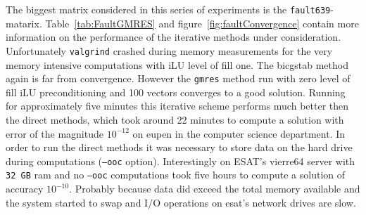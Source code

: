 The biggest matrix considered in this series of experiments is the \texttt{fault639}-matarix. Table~\ref{tab:FaultGMRES} and figure~\ref{fig:faultConvergence} contain more information on the performance of the iterative methods under consideration. Unfortunately \texttt{valgrind} crashed during memory measurements for the very memory intensive computations with iLU level of fill one. The bicgstab method again is far from convergence. However the \texttt{gmres} method run with zero level of fill iLU preconditioning and 100 vectors converges to a good solution. Running for approximately five minutes this iterative scheme performs much better then the direct methods, which took around 22 minutes to compute a solution with error of the magnitude $10^{-12}$ on eupen in the computer science department. In order to run the direct methods it was necessary to store data on the hard drive during computations (\texttt{--ooc} option). Interestingly on ESAT's vierre64 server with \texttt{32 GB} ram and no \texttt{--ooc} computations took five hours to compute a solution of accuracy $10^{-10}$. Probably because data did exceed the total memory available and the system started to swap and I/O operations on esat's network drives are slow. 